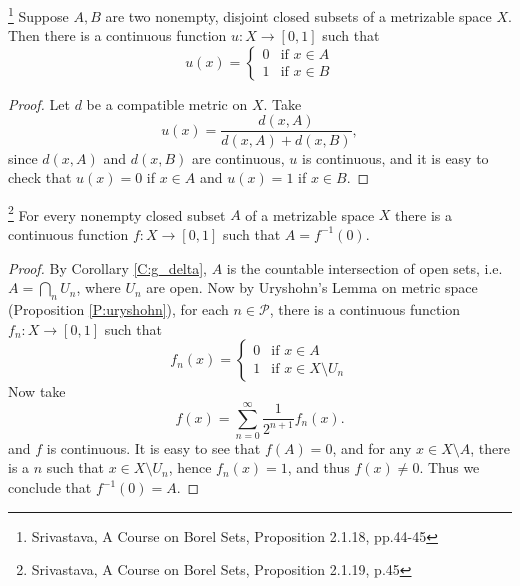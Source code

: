 \begin{proposition}  \label{P:uryshohn}
\footnote{Srivastava, A Course on Borel Sets, Proposition 2.1.18, pp.44-45}
Suppose $A,B$ are two nonempty, disjoint closed subsets of a metrizable space
$X$. Then there is a continuous function $u:X\to [0,1]$ such that
\[
  u(x)=
    \begin{cases} 
      0     & \text{if $x\in A$}    \\
      1     & \text{if $x\in B$}
    \end{cases}
\]
\end{proposition}
\begin{proof}
Let $d$ be a compatible metric on $X$. Take
\[
  u(x)=\frac{d(x,A)}{d(x,A)+d(x,B)},
\]
since $d(x,A)$ and $d(x,B)$ are continuous, $u$ is continuous, and it is easy to
check that $u(x)=0$ if $x\in A$ and $u(x)=1$ if $x\in B$.
\end{proof}

\begin{proposition} \label{P:metric_contin}
\footnote{Srivastava, A Course on Borel Sets, Proposition 2.1.19, p.45}
For every nonempty closed subset $A$ of a metrizable space $X$ there is a
continuous function $f:X\to [0,1]$ such that $A=f^{-1}(0)$.
\end{proposition}
\begin{proof}
By Corollary \ref{C:g_delta}, $A$ is the countable intersection of open sets,
i.e. $A=\bigcap_n U_n$, where $U_n$ are open. Now by Uryshohn's Lemma on metric
space (Proposition \ref{P:uryshohn}), for each $n\in \mathcal{P}$, there is a
continuous function $f_n:X\to [0,1]$ such that 
\[
  f_n(x)=
    \begin{cases} 
      0     & \text{if $x\in A$}    \\
      1     & \text{if $x\in X\setminus U_n$}
    \end{cases}
\]
Now take
\[
	f(x) = \sum_{n=0}^{\infty} \frac{1}{2^{n+1}} f_n(x).
\]
and $f$ is continuous. It is easy to see that $f(A)=0$, and for any 
$x\in X\setminus A$, there is a $n$ such that $x\in X\setminus U_n$, hence
$f_n(x)=1$, and thus $f(x)\neq 0$. Thus we conclude that $f^{-1}(0)=A$.
\end{proof}


